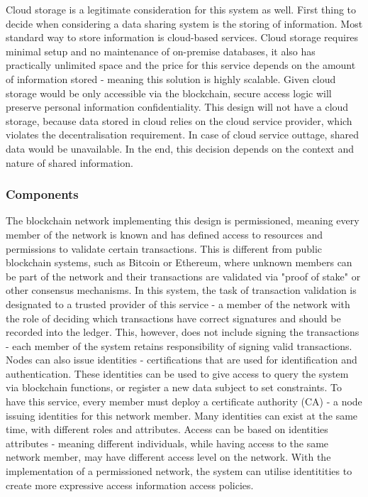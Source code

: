 \documentclass[12pt]{article}
\begin{document}
    Cloud storage is a legitimate consideration for this system as well. First thing to decide when considering a data sharing system is the storing of information. Most standard way to store information is cloud-based services. Cloud storage requires minimal setup and no maintenance of on-premise databases, it also has practically unlimited space and the price for this service depends on the amount of information stored - meaning this solution is highly scalable. Given cloud storage would be only accessible via the blockchain, secure access logic will preserve personal information confidentiality. This design will not have a cloud storage, because data stored in cloud relies on the cloud service provider, which violates the decentralisation requirement. In case of cloud service outtage, shared data would be unavailable. In the end, this decision depends on the context and nature of shared information.
    
    \subsubsection{Components}
    The blockchain network implementing this design is permissioned, meaning every member of the network is known and has defined access to resources and permissions to validate certain transactions. This is different from public blockchain systems, such as Bitcoin\cite{bitcoin} or Ethereum\cite{ethereum}, where unknown members can be part of the network and their transactions are validated via "proof of stake" or other consensus mechanisms. In this system, the task of transaction validation is designated to a trusted provider of this service - a member of the network with the role of deciding which transactions have correct signatures and should be recorded into the ledger. This, however, does not include signing the transactions - each member of the system retains responsibility of signing valid transactions. Nodes can also issue identities - certifications that are used for identification and authentication. These identities can be used to give access to query the system via blockchain functions, or register a new data subject to set constraints. To have this service, every member must deploy a certificate authority (CA) - a node issuing identities for this network member. Many identities can exist at the same time, with different roles and attributes. Access can be based on identities attributes - meaning different individuals, while having access to the same network member, may have different access level on the network. With the implementation of a permissioned network, the system can utilise identitities to create more expressive access information access policies.
    
\end{document}
